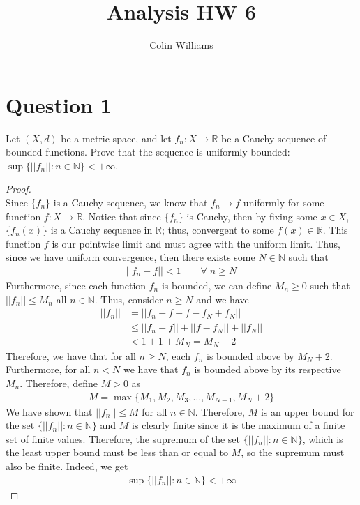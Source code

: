 \documentclass[10pt,a4paper]{article}
\title{Analysis HW 6}
\author{Colin Williams}
\theoremstyle{definition}
\theoremstyle{definition}
\numberwithin{equation}{section}
\begin{document}
\maketitle

\section*{Question 1}
Let $(X, d)$ be a metric space, and let $f_n : X \to \mathbb{R}$ be a Cauchy sequence of bounded functions. Prove that the sequence is uniformly bounded: $\sup\{||f_n||: n \in \mathbb{N}\} < +\infty$. 

\begin{proof}$ $
\\Since $\{f_n\}$ is a Cauchy sequence, we know that $f_n \to f$ uniformly for some function $f: X \to \mathbb{R}$. Notice that since $\{f_n\}$ is Cauchy, then by fixing some $x \in X$, $\{f_n(x)\}$ is a Cauchy sequence in $\mathbb{R}$; thus, convergent to some $f(x) \in \mathbb{R}$. This function $f$ is our pointwise limit and must agree with the uniform limit. Thus, since we have uniform convergence, then there exists some $N \in \mathbb{N}$ such that 
\begin{align*}
||f_n - f|| < 1 \qquad \forall \; n \geq N
\end{align*}
Furthermore, since each function $f_n$ is bounded, we can define $M_n \geq 0$ such that $||f_n|| \leq M_n$ all $n \in \mathbb{N}$. Thus, consider $n \geq N$ and we have
\begin{align*}
||f_n|| &= ||f_n - f + f - f_N + f_N||\\
&\leq ||f_n - f|| + ||f - f_N|| + ||f_N||\\
&< 1 + 1 + M_N = M_N + 2
\end{align*}
Therefore, we have that for all $n \geq N$, each $f_n$ is bounded above by $M_N + 2$. Furthermore, for all $n < N$ we have that $f_n$ is bounded above by its respective $M_n$. Therefore, define $M > 0$ as 
\begin{align*}
M = \max\{M_1, M_2, M_3, \ldots, M_{N - 1}, M_N + 2\}
\end{align*}
We have shown that $||f_n|| \leq M$ for all $n \in \mathbb{N}$. Therefore, $M$ is an upper bound for the set $\{||f_n|| : n \in \mathbb{N}\}$ and $M$ is clearly finite since it is the maximum of a finite set of finite values. Therefore, the supremum of the set $\{||f_n|| : n \in \mathbb{N}\}$, which is the least upper bound must be less than or equal to $M$, so the supremum must also be finite. Indeed, we get
\begin{align*}
\sup\{||f_n|| : n \in \mathbb{N}\} < +\infty
\end{align*}
\end{proof}
\end{document}
